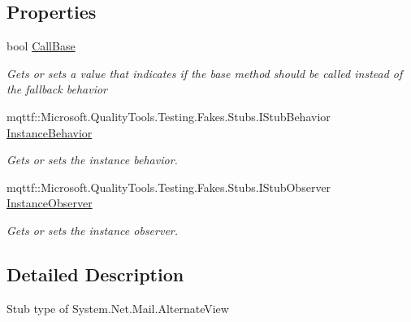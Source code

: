 \subsection*{Properties}
\begin{DoxyCompactItemize}
\item 
bool \hyperlink{class_system_1_1_net_1_1_mail_1_1_fakes_1_1_stub_alternate_view_a6e6a40b99a92e14f5249aba6e24b0481}{Call\-Base}
\begin{DoxyCompactList}\small\item\em Gets or sets a value that indicates if the base method should be called instead of the fallback behavior\end{DoxyCompactList}\item 
mqttf\-::\-Microsoft.\-Quality\-Tools.\-Testing.\-Fakes.\-Stubs.\-I\-Stub\-Behavior \hyperlink{class_system_1_1_net_1_1_mail_1_1_fakes_1_1_stub_alternate_view_a6ea70f9b8f7e189d93fb47fc54de9506}{Instance\-Behavior}
\begin{DoxyCompactList}\small\item\em Gets or sets the instance behavior.\end{DoxyCompactList}\item 
mqttf\-::\-Microsoft.\-Quality\-Tools.\-Testing.\-Fakes.\-Stubs.\-I\-Stub\-Observer \hyperlink{class_system_1_1_net_1_1_mail_1_1_fakes_1_1_stub_alternate_view_a4a91c6ea908d9aaa974e43a61eebfcf9}{Instance\-Observer}
\begin{DoxyCompactList}\small\item\em Gets or sets the instance observer.\end{DoxyCompactList}\end{DoxyCompactItemize}


\subsection{Detailed Description}
Stub type of System.\-Net.\-Mail.\-Alternate\-View



